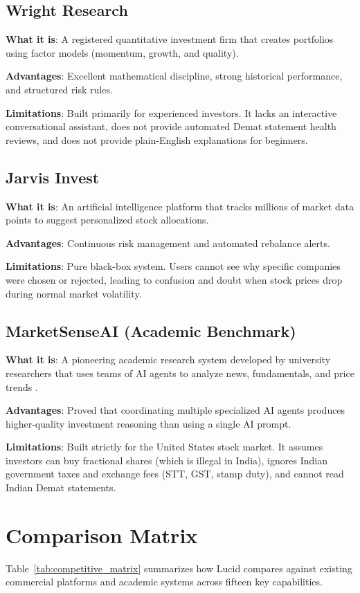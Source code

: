 \subsection{Wright Research}
\textbf{What it is}: A registered quantitative investment firm that creates portfolios using factor models (momentum, growth, and quality).

\textbf{Advantages}: Excellent mathematical discipline, strong historical performance, and structured risk rules.

\textbf{Limitations}: Built primarily for experienced investors. It lacks an interactive conversational assistant, does not provide automated Demat statement health reviews, and does not provide plain-English explanations for beginners.

\subsection{Jarvis Invest}
\textbf{What it is}: An artificial intelligence platform that tracks millions of market data points to suggest personalized stock allocations.

\textbf{Advantages}: Continuous risk management and automated rebalance alerts.

\textbf{Limitations}: Pure black-box system. Users cannot see why specific companies were chosen or rejected, leading to confusion and doubt when stock prices drop during normal market volatility.

\subsection{MarketSenseAI (Academic Benchmark)}
\textbf{What it is}: A pioneering academic research system developed by university researchers that uses teams of AI agents to analyze news, fundamentals, and price trends \cite{fatouros2024}.

\textbf{Advantages}: Proved that coordinating multiple specialized AI agents produces higher-quality investment reasoning than using a single AI prompt.

\textbf{Limitations}: Built strictly for the United States stock market. It assumes investors can buy fractional shares (which is illegal in India), ignores Indian government taxes and exchange fees (STT, GST, stamp duty), and cannot read Indian Demat statements.

\section{Comparison Matrix}
Table~\ref{tab:competitive_matrix} summarizes how Lucid compares against existing commercial platforms and academic systems across fifteen key capabilities.

